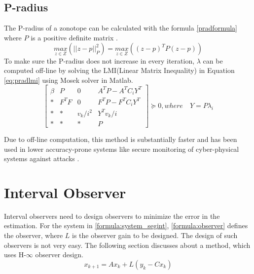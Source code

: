 \subsection{P-radius}
The P-radius of a zonotope can be calculated with the formula \eqref{pradformula} where $P$ is a positive definite matrix \cite{Alamo2005}.
\begin{equation}
\label{pradformula}
\underset{z \in Z}{max} (||z - p||^2_{P}) = \underset{z \in Z}{max}((z-p)^T P (z-p))
\end{equation}
To make sure the P-radius does not increase in every iteration, $\lambda$ can be computed off-line by solving the LMI(Linear Matrix Inequality) in Equation \eqref{eq:pradlmi} using Mosek solver in Matlab\textsuperscript{\tiny\textregistered}.
\begin{equation}
\label{eq:pradlmi}
\left[
\begin{matrix}
\beta & P & 0 & A^TP - A^TC_iY^T\\
* & F^TF & 0 & F^TP -F^TC_iY^T\\
* & * & v_k/i ^2 & Y^Tv_k/i\\
* & * & * & P
\end{matrix}\right] \succeq 0,
where\quad Y = P\lambda_i
\end{equation}

Due to off-line computation, this method is substantially faster and has been used in lower accuracy-prone systems like secure monitoring of cyber-physical systems against attacks \cite{GE20201592}.

\section{Interval Observer}
Interval observers need to design observers to minimize the error in the estimation. For the system in \eqref{formula:system_segint}, \eqref{formula:observer} defines the observer, where $L$ is the observer gain to be designed. The design of such observers is not very easy. The following section discusses about a method, which uses H-$\infty$ observer design.
\begin{equation}
\label{formula:observer}
x_{k+1} = Ax_k + L(y_k -Cx_k)
\end{equation}

